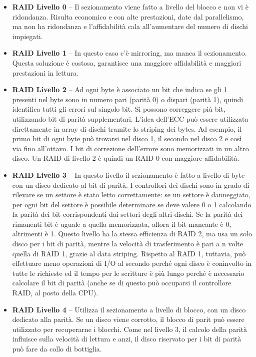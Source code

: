 \documentclass[a4]{article}
\begin{document}
\begin{itemize}
    \item \textbf{RAID Livello 0} -- Il sezionamento viene fatto a livello del blocco e non vi è ridondanza. Risulta economico e con alte prestazioni, date dal parallelismo, ma non ha ridondanza e l'affidabilità cala all'aumentare del numero di dischi impiegati.
    \item \textbf{RAID Livello 1} -- In questo caso c'è mirroring, ma manca il sezionamento. Questa soluzione è costosa, garantisce una maggiore affidabilità e maggiori prestazioni in lettura.
    \item \textbf{RAID Livello 2} -- Ad ogni byte è associato un bit che indica se gli 1 presenti nel byte sono in numero pari (parità 0) o dispari (parità 1), quindi identifica tutti gli errori sul singolo bit. Si possono correggere più bit, utilizzando bit di parità supplementari. L'idea dell'ECC può essere utilizzata direttamente in array di dischi tramite lo striping dei bytes. Ad esempio, il primo bit di ogni byte può trovarsi nel disco 1, il secondo nel disco 2 e così via fino all'ottavo. I bit di correzione dell'errore sono memorizzati in un altro disco. Un RAID di livello 2 è quindi un RAID 0 con maggiore affidabilità.
    \item \textbf{RAID Livello 3} -- In questo livello il sezionamento è fatto a livello di byte con un disco dedicato al bit di parità. I controllori dei dischi sono in grado di rilevare se un settore è stato letto correttamente: se un settore è danneggiato, per ogni bit del settore è possibile determinare se deve valere 0 o 1 calcolando la parità dei bit corrispondenti dai settori degli altri dischi. Se la parità dei rimanenti bit è uguale a quella memorizzata, allora il bit mancante è 0, altrimenti è 1. Questo livello ha la stessa efficienza di RAID 2, ma usa un solo disco per i bit di parità, mentre la velocità di trasferimento è pari a n volte quella di RAID 1, grazie al data striping. Rispetto al RAID 1, tuttavia, può effettuare meno operazioni di I/O al secondo perché ogni disco è coninvolto in tutte le richieste ed il tempo per le scritture è più lungo perché è necessario calcolare il bit di parità (anche se di questo può occuparsi il controllore RAID, al posto della CPU).
    \item \textbf{RAID Livello 4} -- Utilizza il sezionamento a livello di blocco, con un disco dedicato alla parità. Se un disco viene corrotto, il blocco di parit può essere utilizzato per recuperarne i blocchi. Come nel livello 3, il calcolo della parità influisce sulla velocità di lettura e anzi, il disco riservato per i bit di parità può fare da collo di bottiglia.

\end{itemize}
\end{document}
